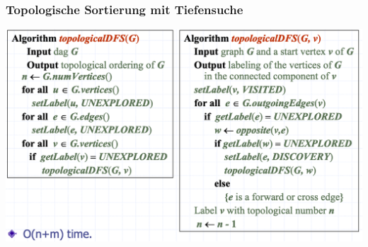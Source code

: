 \subsubsection{Topologische Sortierung mit Tiefensuche}
\begin{center}
    \includegraphics[scale=.28]{graphic/14 Digraphs/topologische Sortierung mit Tiefensuche.png}
\end{center}
\vspace{-8pt}

\newpage
